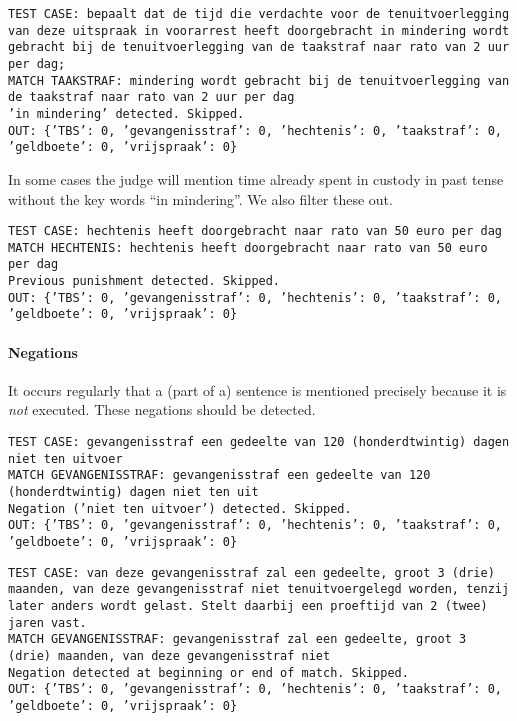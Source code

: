 \documentclass[a4paper]{article}
\begin{document}
\texttt{TEST CASE: %
bepaalt dat de tijd die verdachte voor de tenuitvoerlegging van deze uitspraak in voorarrest heeft doorgebracht in mindering wordt gebracht bij de tenuitvoerlegging van de taakstraf naar rato van 2 uur per dag;\\
MATCH TAAKSTRAF: mindering wordt gebracht bij de tenuitvoerlegging van de taakstraf naar rato van 2 uur per dag\\
'in mindering' detected. Skipped.\\
OUT: \{'TBS': 0, 'gevangenisstraf': 0, 'hechtenis': 0, 'taakstraf': 0, 'geldboete': 0, 'vrijspraak': 0\}}

In some cases the judge will mention time already spent in custody in past tense without the key words ``in mindering''.
We also filter these out.

\texttt{TEST CASE: %
hechtenis heeft doorgebracht naar rato van 50 euro per dag\\
MATCH HECHTENIS: hechtenis heeft doorgebracht naar rato van 50 euro per dag\\
Previous punishment detected. Skipped.\\
OUT: \{'TBS': 0, 'gevangenisstraf': 0, 'hechtenis': 0, 'taakstraf': 0, 'geldboete': 0, 'vrijspraak': 0\}}

\paragraph{Negations}

It occurs regularly that a (part of a) sentence is mentioned precisely because it is \emph{not} executed.
These negations should be detected.

\texttt{TEST CASE: %
gevangenisstraf een gedeelte van 120 (honderdtwintig) dagen niet ten uitvoer\\
MATCH GEVANGENISSTRAF: gevangenisstraf een gedeelte van 120 (honderdtwintig) dagen niet ten uit\\
Negation ('niet ten uitvoer') detected. Skipped.\\
OUT: \{'TBS': 0, 'gevangenisstraf': 0, 'hechtenis': 0, 'taakstraf': 0, 'geldboete': 0, 'vrijspraak': 0\}}

\texttt{TEST CASE: %
van deze gevangenisstraf zal een gedeelte, groot 3 (drie) maanden, van deze gevangenisstraf niet tenuitvoergelegd worden, tenzij later anders wordt gelast. Stelt daarbij een proeftijd van 2 (twee) jaren vast.\\
MATCH GEVANGENISSTRAF: gevangenisstraf zal een gedeelte, groot 3 (drie) maanden, van deze gevangenisstraf niet\\
Negation detected at beginning or end of match. Skipped.\\
OUT: \{'TBS': 0, 'gevangenisstraf': 0, 'hechtenis': 0, 'taakstraf': 0, 'geldboete': 0, 'vrijspraak': 0\}}
\end{document}
